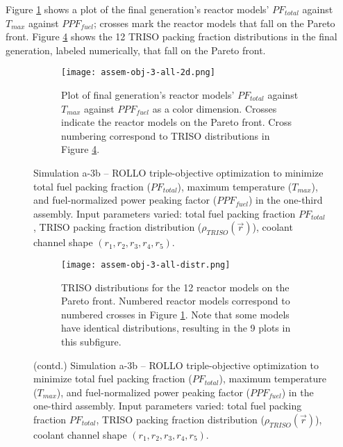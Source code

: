 Figure \ref{fig:assem-obj-3-all-2d} shows a plot of the final generation's reactor 
models' $PF_{total}$ against $T_{max}$ against $PPF_{fuel}$; crosses mark the reactor 
models that fall on the Pareto front.
Figure \ref{fig:assem-obj-3-all-distr} shows the 12 TRISO packing fraction distributions 
in the final generation, labeled numerically, that fall on the Pareto front. 
\begin{figure}[htbp!]
    \begin{subfigure}{\textwidth}
        \centering
        \texttt{[image: assem-obj-3-all-2d.png]}
        \caption{Plot of final generation's reactor models' $PF_{total}$ against 
        $T_{max}$ against $PPF_{fuel}$ as a color dimension. 
        Crosses indicate the reactor models on the 
        Pareto front. Cross numbering correspond to TRISO distributions in Figure 
        \ref{fig:assem-obj-3-all-distr}.}
        \label{fig:assem-obj-3-all-2d} 
    \end{subfigure}
    \caption{Simulation a-3b -- ROLLO triple-objective optimization to minimize total 
    fuel packing fraction ($PF_{total}$), maximum temperature ($T_{max}$), and 
    fuel-normalized power peaking factor ($PPF_{fuel}$) in the one-third assembly. 
    Input parameters varied: total fuel packing fraction $PF_{total}$, 
    TRISO packing fraction distribution ($\rho_{TRISO}(\vec{r})$), 
    coolant channel shape $(r_1, r_2, r_3, r_4, r_5)$.}
    \label{fig:assem-obj-3-all}
\end{figure}
\begin{figure}[htbp!]
    \ContinuedFloat
    \begin{subfigure}{\textwidth}
        \centering
        \texttt{[image: assem-obj-3-all-distr.png]}
        \caption{TRISO distributions for the 12 reactor models on the Pareto front.
        Numbered reactor models correspond to numbered crosses in Figure 
        \ref{fig:assem-obj-3-all-2d}. 
        Note that some models have identical distributions, resulting in the 9 plots 
        in this subfigure.}
        \label{fig:assem-obj-3-all-distr} 
    \end{subfigure}
    \caption{(contd.) Simulation a-3b -- ROLLO triple-objective optimization to minimize 
    total fuel packing fraction ($PF_{total}$), maximum temperature ($T_{max}$), 
    and fuel-normalized power peaking factor ($PPF_{fuel}$) in the one-third assembly. 
    Input parameters varied: total fuel packing fraction $PF_{total}$, 
    TRISO packing fraction distribution ($\rho_{TRISO}(\vec{r})$), 
    coolant channel shape $(r_1, r_2, r_3, r_4, r_5)$.}
\end{figure}


